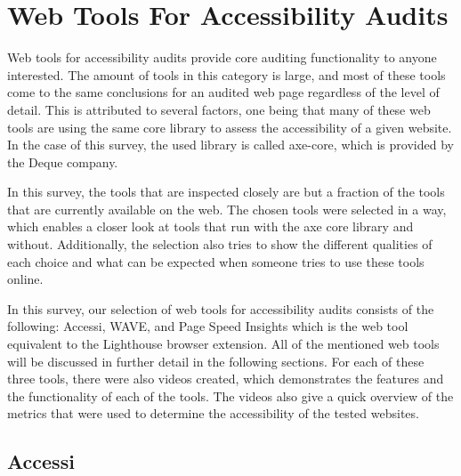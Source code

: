 %
%
% 
% 
% 


\chapter{Web Tools For Accessibility Audits}

\label{chap:WebTools}



Web tools for accessibility audits provide core auditing functionality
to anyone interested. The amount of tools in this category is large,
and most of these tools come to the same conclusions for an audited
web page regardless of the level of detail. This is attributed to
several factors, one being that many of these web tools are using the
same core library to assess the accessibility of a given website. In
the case of this survey, the used library is called axe-core, which is
provided by the Deque company.

In this survey, the tools that are inspected closely are but a
fraction of the tools that are currently available on the web. The
chosen tools were selected in a way, which enables a closer look at
tools that run with the axe core library and without. Additionally,
the selection also tries to show the different qualities of each
choice and what can be expected when someone tries to use these tools
online.

In this survey, our selection of web tools for accessibility audits
consists of the following: Accessi, WAVE, and Page Speed Insights
which is the web tool equivalent to the Lighthouse browser
extension. All of the mentioned web tools will be discussed in further
detail in the following sections. For each of these three tools, there
were also videos created, which demonstrates the features and the
functionality of each of the tools. The videos also give a quick
overview of the metrics that were used to determine the accessibility
of the tested websites.




\section{Accessi}

